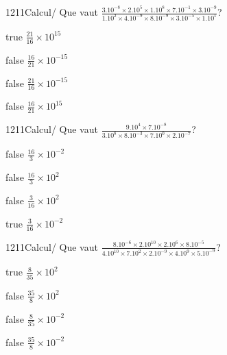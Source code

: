 \documentclass[11pt]{article}
\begin{document}
            \begin{question}{1211}{Calcul}{}{/}
                Que vaut $\frac{3.10^{-8}\times 2.10^{5}\times 1.10^{8}\times 7.10^{-1}\times 3.10^{-9}}{1.10^{2}\times 4.10^{-9}\times 8.10^{-9}\times 3.10^{-5}\times 1.10^{1}}$?
            \end{question}
            
            \begin{reponses}
                \item[true] $\frac{21}{16}\times 10^{15}$
                \item[false] $\frac{16}{21}\times 10^{-15}$
                \item[false] $\frac{21}{16}\times 10^{-15}$
                \item[false] $\frac{16}{21}\times 10^{15}$
            \end{reponses}
            
            \begin{question}{1211}{Calcul}{}{/}
                Que vaut $\frac{9.10^{4}\times 7.10^{-8}}{3.10^{8}\times 8.10^{-3}\times 7.10^{0}\times 2.10^{-7}}$?
            \end{question}
            
            \begin{reponses}
                \item[false] $\frac{16}{3}\times 10^{-2}$
                \item[false] $\frac{16}{3}\times 10^{2}$
                \item[false] $\frac{3}{16}\times 10^{2}$
                \item[true] $\frac{3}{16}\times 10^{-2}$
            \end{reponses}
            
            \begin{question}{1211}{Calcul}{}{/}
                Que vaut $\frac{8.10^{-6}\times 2.10^{10}\times 2.10^{6}\times 8.10^{-5}}{4.10^{10}\times 7.10^{2}\times 2.10^{-9}\times 4.10^{9}\times 5.10^{-9}}$?
            \end{question}
            
            \begin{reponses}
                \item[true] $\frac{8}{35}\times 10^{2}$
                \item[false] $\frac{35}{8}\times 10^{2}$
                \item[false] $\frac{8}{35}\times 10^{-2}$
                \item[false] $\frac{35}{8}\times 10^{-2}$
            \end{reponses}
            
\end{document}
